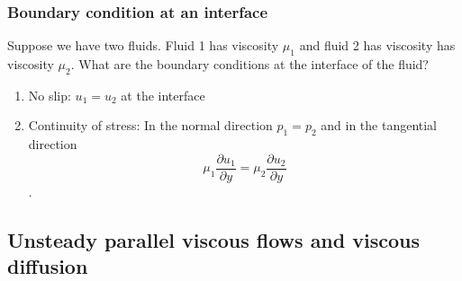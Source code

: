 \documentclass{article}
\begin{document}
\subsubsection{Boundary condition at an interface}
Suppose we have two fluids. Fluid 1 has viscosity $ \mu_1 $ and fluid 2 has viscosity has viscosity $ \mu_2 $. What are the boundary conditions at the interface of the fluid?
\begin{enumerate}
	\item No slip: $ u_1=u_2 $ at the interface\\
	\item Continuity of stress: In the normal direction $ p_1=p_2 $ and in the tangential direction \[ \mu_1\frac{\partial u_1}{\partial y} = \mu_2 \frac{\partial u_2}{\partial y} \].
\end{enumerate}
\subsection{Unsteady parallel viscous flows and viscous diffusion}
\end{document}

